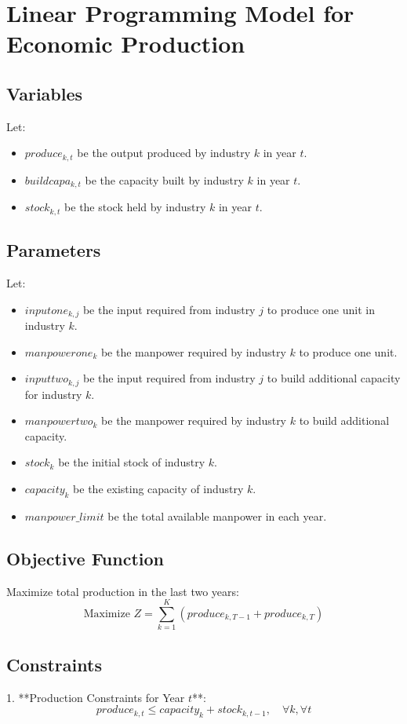\documentclass{article}
\begin{document}
\section*{Linear Programming Model for Economic Production}

\subsection*{Variables}
Let:
\begin{itemize}
    \item $produce_{k, t}$ be the output produced by industry $k$ in year $t$.
    \item $buildcapa_{k, t}$ be the capacity built by industry $k$ in year $t$.
    \item $stock_{k, t}$ be the stock held by industry $k$ in year $t$.
\end{itemize}

\subsection*{Parameters}
Let:
\begin{itemize}
    \item $inputone_{k, j}$ be the input required from industry $j$ to produce one unit in industry $k$.
    \item $manpowerone_{k}$ be the manpower required by industry $k$ to produce one unit.
    \item $inputtwo_{k, j}$ be the input required from industry $j$ to build additional capacity for industry $k$.
    \item $manpowertwo_{k}$ be the manpower required by industry $k$ to build additional capacity.
    \item $stock_{k}$ be the initial stock of industry $k$.
    \item $capacity_{k}$ be the existing capacity of industry $k$.
    \item $manpower\_limit$ be the total available manpower in each year.
\end{itemize}

\subsection*{Objective Function}
Maximize total production in the last two years:
\[
\text{Maximize } Z = \sum_{k=1}^{K} (produce_{k, T-1} + produce_{k, T})
\]

\subsection*{Constraints}
1. **Production Constraints for Year $t$**:
\[
produce_{k, t} \leq capacity_{k} + stock_{k, t-1}, \quad \forall k, \forall t
\]
\end{document}
